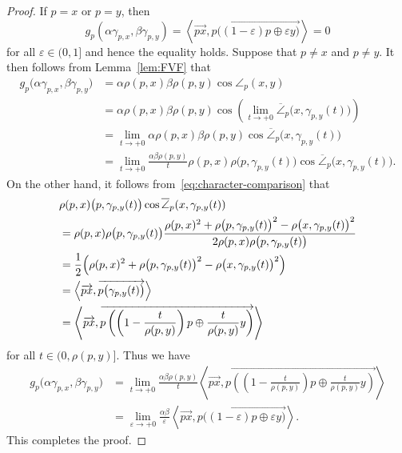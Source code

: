 \documentclass[draft]{amsart}
\numberwithin{equation}{section}
\newcommand{\ip}[2]{\left\langle #1, #2 \right\rangle}
\theoremstyle{plain}
\theoremstyle{definition}
\theoremstyle{remark}
\begin{document}
\begin{proof}
 If $p=x$ or $p=y$, then 
 \[
  g_p(\alpha \gamma_{p, x}, \beta \gamma_{p, y}) 
 =  \ip{\overrightarrow{px}}{\overrightarrow{p \bigl((1-\varepsilon)p\oplus \varepsilon y \bigr)}} = 0
 \]
 for all $\varepsilon \in (0,1]$ and hence 
 the equality holds. Suppose that 
 $p\neq x$ and $p\neq y$. 
 It then follows from Lemma~\ref{lem:FVF} that 
 \begin{align*}
  g_p\bigl(\alpha \gamma_{p, x}, \beta \gamma_{p, y}\bigr) 
  &= \alpha \rho(p, x)\beta \rho(p, y) \cos \angle_p(x,y) \\
  &= \alpha \rho(p, x) \beta \rho(p, y) \cos 
  \left(
  \lim_{t\to +0}\overline{\angle}_p\bigl(x, \gamma_{p, y}(t)\bigr)
  \right) \\
  &= \lim_{t\to +0}\alpha \rho(p, x)\beta \rho(p, y) \cos 
  \overline{\angle}_p\bigl(x, \gamma_{p, y}(t)\bigr) \\
  &= \lim_{t\to +0}
 \frac{\alpha \beta \rho(p, y)}{t}
 \rho(p, x)\rho\bigl(p, \gamma_{p, y}(t)\bigr) \cos 
  \overline{\angle}_p\bigl(x, \gamma_{p, y}(t) \bigr). 
 \end{align*} 
 On the other hand, 
 it follows from~\eqref{eq:character-comparison} that 
 \begin{align*}
  &\rho(p, x)\bigl(p, \gamma_{p, y}(t)\bigr) \cos 
  \overline{\angle}_p(x, \gamma_{p, y}(t)) \\
  &= \rho(p, x) \rho\bigl(p, \gamma_{p, y}(t)\bigr)
  \frac{\rho(p, x)^2 + \rho\bigl(p, \gamma_{p, y}(t)\bigr)^2 
 -\rho\bigl(x, \gamma_{p, y}(t)\bigr)^2}
 {2\rho(p, x)\rho\bigl(p, \gamma_{p, y}(t)\bigr)} \\
  &= \frac{1}{2} \Bigl(
 \rho(p, x)^2 + \rho\bigl(p, \gamma_{p, y}(t)\bigr)^2 
 -\rho\bigl(x, \gamma_{p, y}(t)\bigr)^2
 \Bigr) \\
  &= \ip{\overrightarrow{px}}
 {\overrightarrow{p\bigl(\gamma_{p,y}(t)\bigr)}} \\
  &= \ip{\overrightarrow{px}}{\overrightarrow{p\left(
 \left(1-\frac{t}{\rho(p,y)}\right) p \oplus \frac{t}{\rho(p, y)}y
 \right)}}
 \end{align*}
 for all $t\in (0,\rho(p, y)]$. 
 Thus we have 
 \begin{align*}
  g_p\bigl(\alpha \gamma_{p, x}, \beta \gamma_{p, y}\bigr) 
  &= \lim_{t\to +0} 
  \frac{\alpha \beta \rho(p, y)}{t}
  \ip{\overrightarrow{px}}{\overrightarrow{p\left(
 \left(1-\frac{t}{\rho(p,y)}\right) p \oplus \frac{t}{\rho(p, y)}y
 \right)}} \\
  &= \lim_{\varepsilon \to +0} 
 \frac{\alpha \beta}{\varepsilon}
 \ip{\overrightarrow{px}}
 {\overrightarrow{p 
 \bigl((1-\varepsilon)p\oplus \varepsilon y \bigr)}}.
 \end{align*}
 This completes the proof. 
\end{proof}
\end{document}
